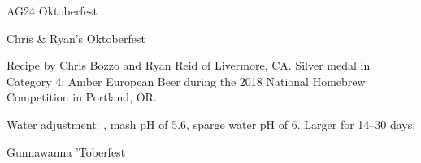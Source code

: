 \begin{recipe}{AG24 Oktoberfest}
\begin{recipe}{Chris \& Ryan's Oktoberfest}
\begin{aboutblock}
Recipe by Chris Bozzo and Ryan Reid of Livermore, CA. Silver medal in Category 4:
Amber European Beer during the 2018 National Homebrew Competition in Portland, OR.
\sourceaha
\end{aboutblock}


\begin{methodandtiming}

\begin{mashsteps}
\end{mashsteps}

\begin{fermentationsteps}
\end{fermentationsteps}

\begin{directions}
Water adjustment: , mash pH of 5.6, sparge
water pH of 6. Larger for 14--30 days.
\end{directions}

\end{methodandtiming}

\recipebreak

\begin{ingredientsblock}

\begin{malts}
\end{malts}

\begin{hops}
\end{hops}


\end{ingredientsblock}

\end{recipe}

\begin{recipe}{Gunnawanna 'Toberfest} %


\end{recipe}
\end{recipe}
